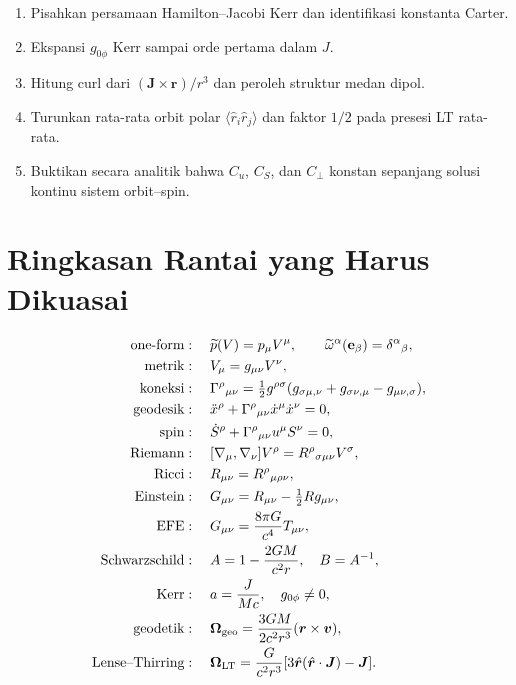 \documentclass[12pt,a4paper]{report}
\newcommand{\e}{\mathbf{e}}
\newcommand{\dual}{\widetilde{\omega}}
\newcommand{\oneformp}{\widetilde{p}}
\begin{document}
\begin{enumerate}[label=\arabic*.]
 \item Pisahkan persamaan Hamilton--Jacobi Kerr dan identifikasi konstanta Carter.
 \item Ekspansi $g_{0\phi}$ Kerr sampai orde pertama dalam $J$.
 \item Hitung curl dari $(\bm J\times\bm r)/r^3$ dan peroleh struktur medan dipol.
 \item Turunkan rata-rata orbit polar
 $\langle\hat r_i\hat r_j\rangle$ dan faktor $1/2$ pada presesi LT rata-rata.
 \item Buktikan secara analitik bahwa $C_u$, $C_S$, dan $C_\perp$ konstan sepanjang
 solusi kontinu sistem orbit--spin.
\end{enumerate}

\chapter*{Ringkasan Rantai yang Harus Dikuasai}

\begin{align*}
 \text{one-form}&:\quad \oneformp(V)=p_\mu V^\mu,
 \qquad \dual^\alpha(\e_\beta)=\delta^\alpha{}_\beta,\\
 \text{metrik}&:\quad V_\mu=g_{\mu\nu}V^\nu,\\
 \text{koneksi}&:\quad
 \Gamma^\rho{}_{\mu\nu}=\tfrac12g^{\rho\sigma}
 (g_{\sigma\mu,\nu}+g_{\sigma\nu,\mu}-g_{\mu\nu,\sigma}),\\
 \text{geodesik}&:\quad \ddot x^\rho+\Gamma^\rho{}_{\mu\nu}
 \dot x^\mu\dot x^\nu=0,\\
 \text{spin}&:\quad \dot S^\rho+\Gamma^\rho{}_{\mu\nu}u^\mu S^\nu=0,\\
 \text{Riemann}&:\quad [\nabla_\mu,\nabla_\nu]V^\rho
 =R^\rho{}_{\sigma\mu\nu}V^\sigma,\\
 \text{Ricci}&:\quad R_{\mu\nu}=R^\rho{}_{\mu\rho\nu},\\
 \text{Einstein}&:\quad G_{\mu\nu}=R_{\mu\nu}-\tfrac12Rg_{\mu\nu},\\
 \text{EFE}&:\quad G_{\mu\nu}=\frac{8\pi G}{c^4}T_{\mu\nu},\\
 \text{Schwarzschild}&:\quad A=1-\frac{2GM}{c^2r},\quad B=A^{-1},\\
 \text{Kerr}&:\quad a=\frac{J}{Mc},\quad g_{0\phi}\ne0,\\
 \text{geodetik}&:\quad
 \bm\Omega_{\rm geo}=\frac{3GM}{2c^2r^3}(\bm r\times\bm v),\\
 \text{Lense--Thirring}&:\quad
 \bm\Omega_{\rm LT}=\frac{G}{c^2r^3}
 [3\hat{\bm r}(\hat{\bm r}\cdot\bm J)-\bm J].
\end{align*}
\end{document}
